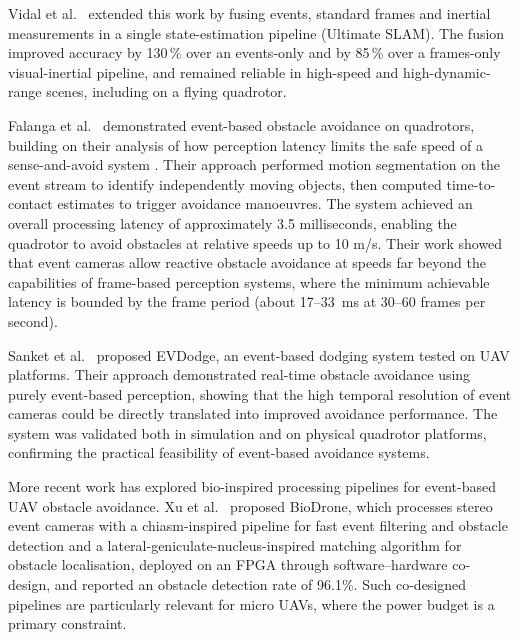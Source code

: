 \documentclass[11pt, a4paper]{report}
\begin{document}
Vidal et al.~\cite{vidal2018ultimate} extended this work by fusing events, standard frames and inertial measurements in a single state-estimation pipeline (Ultimate SLAM). The fusion improved accuracy by 130\,\% over an events-only and by 85\,\% over a frames-only visual-inertial pipeline, and remained reliable in high-speed and high-dynamic-range scenes, including on a flying quadrotor.

Falanga et al.~\cite{falanga2020dynamic} demonstrated event-based obstacle avoidance on quadrotors, building on their analysis of how perception latency limits the safe speed of a sense-and-avoid system \cite{falanga2019fast}. Their approach performed motion segmentation on the event stream to identify independently moving objects, then computed time-to-contact estimates to trigger avoidance manoeuvres. The system achieved an overall processing latency of approximately 3.5 milliseconds, enabling the quadrotor to avoid obstacles at relative speeds up to 10 m/s. Their work showed that event cameras allow reactive obstacle avoidance at speeds far beyond the capabilities of frame-based perception systems, where the minimum achievable latency is bounded by the frame period (about 17--33~ms at 30--60 frames per second).

Sanket et al.~\cite{sanket2020evdodgenet} proposed EVDodge, an event-based dodging system tested on UAV platforms. Their approach demonstrated real-time obstacle avoidance using purely event-based perception, showing that the high temporal resolution of event cameras could be directly translated into improved avoidance performance. The system was validated both in simulation and on physical quadrotor platforms, confirming the practical feasibility of event-based avoidance systems.

More recent work has explored bio-inspired processing pipelines for event-based UAV obstacle avoidance. Xu et al.~\cite{li2024taming} proposed BioDrone, which processes stereo event cameras with a chiasm-inspired pipeline for fast event filtering and obstacle detection and a lateral-geniculate-nucleus-inspired matching algorithm for obstacle localisation, deployed on an FPGA through software--hardware co-design, and reported an obstacle detection rate of 96.1\%. Such co-designed pipelines are particularly relevant for micro UAVs, where the power budget is a primary constraint.
\end{document}
